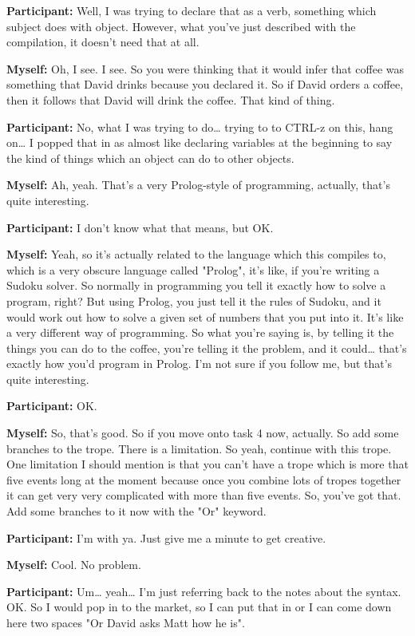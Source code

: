 \documentclass[11pt]{report}
\begin{document}
\begin{linenumbers}
\textbf{Participant:} Well, I was trying to declare that as a verb, something which subject does with object. However, what you've just described with the compilation, it doesn't need that at all.

\textbf{Myself:} Oh, I see. I see. So you were thinking that it would infer that coffee was something that David drinks because you declared it. So if David orders a coffee, then it follows that David will drink the coffee. That kind of thing.

\textbf{Participant:} No, what I was trying to do\ldots{} trying to to CTRL-z on this, hang on\ldots{} I popped that in as almost like declaring variables at the beginning to say the kind of things which an object can do to other objects.

\textbf{Myself:} Ah, yeah. That's a very Prolog-style of programming, actually, that's quite interesting.

\textbf{Participant:} I don't know what that means, but OK.

\textbf{Myself:} Yeah, so it's actually related to the language which this compiles to, which is a very obscure language called "Prolog", it's like, if you're writing a Sudoku solver. So normally in programming you tell it exactly how to solve a program, right? But using Prolog, you just tell it the rules of Sudoku, and it would work out how to solve a given set of numbers that you put into it. It's like a very different way of programming. So what you're saying is, by telling it the things you can do to the coffee, you're telling it the problem, and it could\ldots{} that's exactly how you'd program in Prolog. I'm not sure if you follow me, but that's quite interesting.

\textbf{Participant:} OK.

\textbf{Myself:} So, that's good. So if you move onto task 4 now, actually. So add some branches to the trope. There is a limitation. So yeah, continue with this trope. One limitation I should mention is that you can't have a trope which is more that five events long at the moment because once you combine lots of tropes together it can get very very complicated with more than five events. So, you've got that. Add some branches to it now with the "Or" keyword.

\textbf{Participant:} I'm with ya. Just give me a minute to get creative.

\textbf{Myself:} Cool. No problem.

\textbf{Participant:} Um\ldots{} yeah\ldots{} I'm just referring back to the notes about the syntax. OK. So I would pop in to the market, so I can put that in or I can come down here two spaces "Or David asks Matt how he is".


\end{linenumbers}
\end{document}
